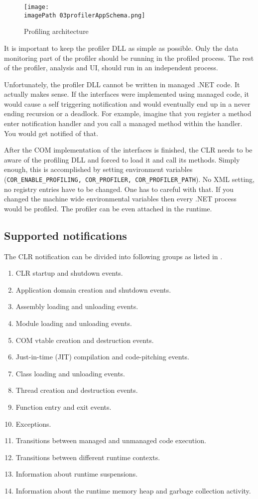 \begin{figure}
	\centering
		\texttt{[image: \\imagePath 03profilerAppSchema.png]}
		\caption{Profiling architecture \cite{ProfMSDN} }
	\label{fig:03profilerAppSchema}
\end{figure}

It is important to keep the profiler DLL as simple as possible. Only the data monitoring part of the profiler should be running in the profiled process. The rest of the profiler, analysis and UI, should run in an independent process.

Unfortunately, the profiler DLL cannot be written in managed .NET code. It actually makes sense. If the interfaces were implemented using managed code, it would cause a self triggering notification and would eventually end up in a never ending recursion or a deadlock. For example, imagine that you register a method enter notification handler and you call a managed method within the handler. You would get notified of that.

After the COM implementation of the interfaces is finished, the CLR needs to be aware of the profiling DLL and forced to load it and call its methods. Simply enough, this is accomplished by setting
 environment variables (\texttt{COR\_ENABLE\_PROFILING, COR\_PROFILER, COR\_PROFILER\_PATH}). No XML setting, no registry entries have to be changed. One has to careful with that. If you changed the machine wide environmental variables then every .NET process would be profiled. The profiler can be even attached in the runtime.

\subsection{Supported notifications}
The CLR notification can be divided into following groups as listed in \cite{ProfMSDN}.

\begin{enumerate}
\item CLR startup and shutdown events.
\item Application domain creation and shutdown events.
\item Assembly loading and unloading events.
\item Module loading and unloading events.
\item COM vtable creation and destruction events.
\item Just-in-time (JIT) compilation and code-pitching events.
\item Class loading and unloading events.
\item Thread creation and destruction events.
\item Function entry and exit events.
\item Exceptions.
\item Transitions between managed and unmanaged code execution.
\item Transitions between different runtime contexts.
\item Information about runtime suspensions.
\item Information about the runtime memory heap and garbage collection activity.
\end{enumerate}

